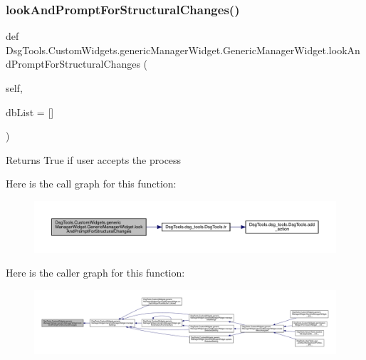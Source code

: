 \subsubsection{\texorpdfstring{look\+And\+Prompt\+For\+Structural\+Changes()}{lookAndPromptForStructuralChanges()}}
{\footnotesize\ttfamily def Dsg\+Tools.\+Custom\+Widgets.\+generic\+Manager\+Widget.\+Generic\+Manager\+Widget.\+look\+And\+Prompt\+For\+Structural\+Changes (\begin{DoxyParamCaption}\item[{}]{self,  }\item[{}]{db\+List = {\ttfamily \mbox{[}\mbox{]}} }\end{DoxyParamCaption})}

\begin{DoxyVerb}Returns True if user accepts the process
\end{DoxyVerb}
 Here is the call graph for this function\+:
\nopagebreak
\begin{figure}[H]
\begin{center}
\leavevmode
\includegraphics[width=350pt]{class_dsg_tools_1_1_custom_widgets_1_1generic_manager_widget_1_1_generic_manager_widget_a3bb4d16fe5ae62ccab8e64058c99bbb2_cgraph}
\end{center}
\end{figure}
Here is the caller graph for this function\+:
\nopagebreak
\begin{figure}[H]
\begin{center}
\leavevmode
\includegraphics[width=350pt]{class_dsg_tools_1_1_custom_widgets_1_1generic_manager_widget_1_1_generic_manager_widget_a3bb4d16fe5ae62ccab8e64058c99bbb2_icgraph}
\end{center}
\end{figure}
\mbox{\label{class_dsg_tools_1_1_custom_widgets_1_1generic_manager_widget_1_1_generic_manager_widget_a0e4887cc182ef03c39f817b816454c54}} 
